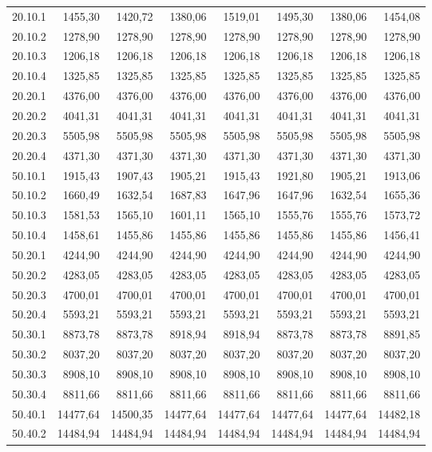 \documentclass[../DoAn.tex]{subfiles}
\begin{document}
\begin{small}
\begin{longtable}{l|rrrrr|rr}
20.10.1 & 1455,30 & 1420,72 & 1380,06 & 1519,01 & 1495,30 & 1380,06 & 1454,08 \\
20.10.2 & 1278,90 & 1278,90 & 1278,90 & 1278,90 & 1278,90 & 1278,90 & 1278,90 \\
20.10.3 & 1206,18 & 1206,18 & 1206,18 & 1206,18 & 1206,18 & 1206,18 & 1206,18 \\
20.10.4 & 1325,85 & 1325,85 & 1325,85 & 1325,85 & 1325,85 & 1325,85 & 1325,85 \\
20.20.1 & 4376,00 & 4376,00 & 4376,00 & 4376,00 & 4376,00 & 4376,00 & 4376,00 \\
20.20.2 & 4041,31 & 4041,31 & 4041,31 & 4041,31 & 4041,31 & 4041,31 & 4041,31 \\
20.20.3 & 5505,98 & 5505,98 & 5505,98 & 5505,98 & 5505,98 & 5505,98 & 5505,98 \\
20.20.4 & 4371,30 & 4371,30 & 4371,30 & 4371,30 & 4371,30 & 4371,30 & 4371,30 \\
50.10.1 & 1915,43 & 1907,43 & 1905,21 & 1915,43 & 1921,80 & 1905,21 & 1913,06 \\
50.10.2 & 1660,49 & 1632,54 & 1687,83 & 1647,96 & 1647,96 & 1632,54 & 1655,36 \\
50.10.3 & 1581,53 & 1565,10 & 1601,11 & 1565,10 & 1555,76 & 1555,76 & 1573,72 \\
50.10.4 & 1458,61 & 1455,86 & 1455,86 & 1455,86 & 1455,86 & 1455,86 & 1456,41 \\
50.20.1 & 4244,90 & 4244,90 & 4244,90 & 4244,90 & 4244,90 & 4244,90 & 4244,90 \\
50.20.2 & 4283,05 & 4283,05 & 4283,05 & 4283,05 & 4283,05 & 4283,05 & 4283,05 \\
50.20.3 & 4700,01 & 4700,01 & 4700,01 & 4700,01 & 4700,01 & 4700,01 & 4700,01 \\
50.20.4 & 5593,21 & 5593,21 & 5593,21 & 5593,21 & 5593,21 & 5593,21 & 5593,21 \\
50.30.1 & 8873,78 & 8873,78 & 8918,94 & 8918,94 & 8873,78 & 8873,78 & 8891,85 \\
50.30.2 & 8037,20 & 8037,20 & 8037,20 & 8037,20 & 8037,20 & 8037,20 & 8037,20 \\
50.30.3 & 8908,10 & 8908,10 & 8908,10 & 8908,10 & 8908,10 & 8908,10 & 8908,10 \\
50.30.4 & 8811,66 & 8811,66 & 8811,66 & 8811,66 & 8811,66 & 8811,66 & 8811,66 \\
50.40.1 & 14477,64 & 14500,35 & 14477,64 & 14477,64 & 14477,64 & 14477,64 & 14482,18 \\
50.40.2 & 14484,94 & 14484,94 & 14484,94 & 14484,94 & 14484,94 & 14484,94 & 14484,94 \\

\end{longtable}
\end{small}
\end{document}
